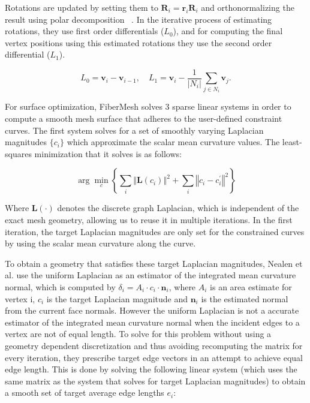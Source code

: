 Rotations are updated by setting them to $\mathbf{R}_{i} = \mathbf{r}_{i}\mathbf{R}_{i}$ and orthonormalizing the result using polar decomposition ~\cite{Fu2007}.
In the iterative process of estimating rotations, they use first order differentials ($L_0$), and for computing the final vertex positions using this estimated rotations they use the second order differential ($L_1$). 

\begin{equation*}
L_{0} = \mathbf{v}_{i} - \mathbf{v}_{i-1}, \quad L_{1} = \mathbf{v}_{i} - \frac{1}{\lvert N_{i} \rvert} \sum_{j \in N_{i}} \mathbf{v}_j.
\end{equation*}

For surface optimization, FiberMesh solves 3 sparse linear systems in order to compute a smooth mesh surface that adheres to the user-defined constraint curves. The first system solves for a set of smoothly varying Laplacian magnitudes $\{c_{i}\}$ which approximate the scalar mean curvature values. The least-squares minimization that it solves is as follows: 

\begin{equation}
\arg\min_{c} \left\lbrace \sum_{i} \left\Vert \mathbf{L}\left(c_{i}\right) \right\Vert^{2} + \sum_{i} \left\Vert c_{i} - c_{i}^{'} \right\Vert^{2} \right\rbrace
\end{equation}

Where $\mathbf{L\left(\cdot\right)}$ denotes the discrete graph Laplacian, which is independent of the exact mesh geometry, allowing us to reuse it in multiple iterations.
In the first iteration, the target Laplacian magnitudes are only set for the constrained curves by using the scalar mean curvature along the curve. 

To obtain a geometry that satisfies these target Laplacian magnitudes, Nealen et al. use the uniform Laplacian as an estimator of the integrated mean curvature normal, which is computed by $\delta_{i} = A_{i} \cdot c_{i} \cdot \mathbf{n}_{i}$, where $A_{i}$ is an area estimate for vertex i, $c_{i}$ is the target Laplacian magnitude and $\mathbf{n}_{i}$ is the estimated normal from the current face normals. However the uniform Laplacian is not a accurate estimator of the integrated mean curvature normal when the incident edges to a vertex are not of equal length. To solve for this problem without using a geometry dependent discretization and thus avoiding recomputing the matrix for every iteration, they prescribe target edge vectors in an attempt to achieve equal edge length. This is done by solving the following linear system (which uses the same matrix as the system that solves for target Laplacian magnitudes) to obtain a smooth set of target average edge lengths $e_{i}$: 

